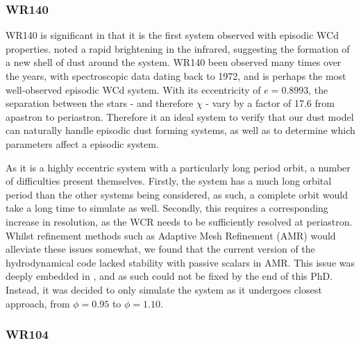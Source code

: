 \subsubsection{WR140}

WR140 is significant in that it is the first system observed with episodic WCd properties.
\textcite{williamsCondensationShellHD1978} noted a rapid brightening in the infrared, suggesting the formation of a new shell of dust around the system.
WR140 been observed many times over the years, with spectroscopic data dating back to 1972, and is perhaps the most well-observed episodic WCd system.
With its eccentricity of $e=0.8993$, the separation between the stars - and therefore $\chi$ - vary by a factor of 17.6 from apastron to periastron.
Therefore it an ideal system to verify that our dust model can naturally handle episodic dust forming systems, as well as to determine which parameters affect a episodic system.

As it is a highly eccentric system with a particularly long period orbit, a number of difficulties present themselves.
Firstly, the system has a much long orbital period than the other systems being considered, as such, a complete orbit would take a long time to simulate as well.
Secondly, this requires a corresponding increase in resolution, as the WCR needs to be sufficiently resolved at periastron.
Whilst refinement methods such as Adaptive Mesh Refinement (AMR) would alleviate these issues somewhat, we found that the current version of the \athena{} hydrodynamical code lacked stability with passive scalars in AMR.
This issue was deeply embedded in \athena{}, and as such could not be fixed by the end of this PhD.
Instead, it was decided to only simulate the system as it undergoes closest approach, from $\phi = 0.95$ to $\phi = 1.10$. 

\subsubsection{WR104}

